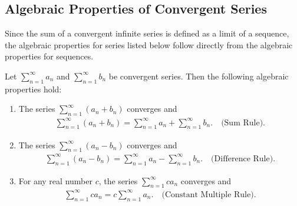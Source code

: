 \documentclass{report}
\begin{document}
    \subsection*{Algebraic Properties of Convergent Series}
    \bigbreak \noindent 
    Since the sum of a convergent infinite series is defined as a limit of a sequence, the algebraic properties for series listed below follow directly from the algebraic properties for sequences.
    \bigbreak \noindent 
    \begin{thrm}
        Let $ \sum_{n=1}^{\infty} a_n$ and $\sum_{n=1}^{\infty} b_n$ be convergent series. Then the following algebraic properties hold:
        \begin{enumerate}
            \item The series 
            $\sum_{n=1}^{\infty} (a_n + b_n)$ converges and 
            \begin{align*}
                \sum_{n=1}^{\infty} (a_n + b_n) = \sum_{n=1}^{\infty} a_n + \sum_{n=1}^{\infty} b_n. \quad \text{(Sum Rule)}
            .\end{align*}
            \item The series $\sum_{n=1}^{\infty} (a_n - b_n)$ converges and 
                \begin{align*}
                    \sum_{n=1}^{\infty} (a_n - b_n) = \sum_{n=1}^{\infty} a_n - \sum_{n=1}^{\infty} b_n. \quad \text{(Difference Rule)}
                .\end{align*}
            \item For any real number \( c \), the series $\sum_{n=1}^{\infty} c a_n$ converges and 
                \begin{align*}
                    \sum_{n=1}^{\infty} c a_n = c \sum_{n=1}^{\infty} a_n. \quad \text{(Constant Multiple Rule)}
                .\end{align*}
        \end{enumerate}
    \end{thrm}

    \bigbreak \noindent 
\end{document}
